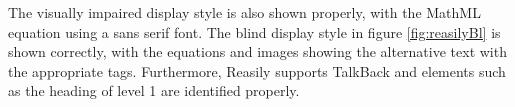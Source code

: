 The visually impaired display style is also shown properly, with the MathML equation using a sans serif font. The blind display style in figure \ref{fig:reasilyBl} is shown correctly, with the equations and images showing the alternative text with the appropriate tags. Furthermore, Reasily supports TalkBack and elements such as the heading of level 1 are identified properly.

